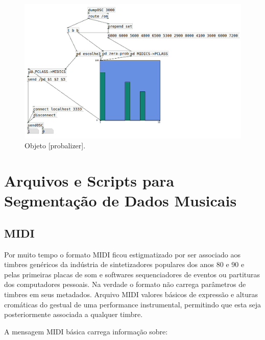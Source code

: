 \documentclass[
	12pt,				%
	openright,			%
	twoside,			%
	a4paper,			%
	english,			%
	french,				%
	spanish,			%
	brazil				%
	]{abntex2}
\begin{document}
\begin{figure}[!h]
	\caption{\label{fig_grafico}Objeto [probalizer].}
	\begin{center}
	    \includegraphics[scale=0.5]{OMPD/Probalizador-PD-OSC-OM.png}
	\end{center}
\end{figure}


\chapter{Arquivos e Scripts para Segmentação de Dados Musicais}
\label{formatos}

\section{MIDI}

Por muito tempo o formato MIDI ficou estigmatizado por ser associado aos timbres genéricos da indústria de sintetizadores populares dos anos 80 e 90 e pelas primeiras placas de som e softwares sequenciadores de eventos ou partituras dos computadores pessoais. 
Na verdade o formato não carrega parâmetros de timbres em seus metadados. Arquivo MIDI valores básicos de expressão e alturas cromáticas do gestual de uma performance instrumental, permitindo que esta seja posteriormente associada a qualquer timbre.

A mensagem MIDI básica carrega informação sobre:
\end{document}
